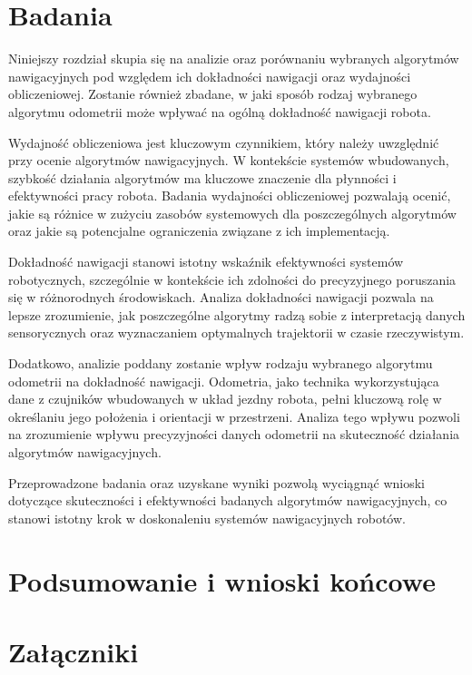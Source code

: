 \documentclass[12pt,twoside]{article}
\begin{document}
\section{Badania}

Niniejszy rozdział skupia się na analizie oraz porównaniu wybranych algorytmów nawigacyjnych pod względem ich dokładności nawigacji oraz wydajności obliczeniowej. Zostanie również zbadane, w jaki sposób rodzaj wybranego algorytmu odometrii może wpływać na ogólną dokładność nawigacji robota.

Wydajność obliczeniowa jest kluczowym czynnikiem, który należy uwzględnić przy ocenie algorytmów nawigacyjnych. W kontekście systemów wbudowanych, szybkość działania algorytmów ma kluczowe znaczenie dla płynności i efektywności pracy robota. Badania wydajności obliczeniowej pozwalają ocenić, jakie są różnice w zużyciu zasobów systemowych dla poszczególnych algorytmów oraz jakie są potencjalne ograniczenia związane z ich implementacją.

Dokładność nawigacji stanowi istotny wskaźnik efektywności systemów robotycznych, szczególnie w kontekście ich zdolności do precyzyjnego poruszania się w różnorodnych środowiskach. Analiza dokładności nawigacji pozwala na lepsze zrozumienie, jak poszczególne algorytmy radzą sobie z interpretacją danych sensorycznych oraz wyznaczaniem optymalnych trajektorii w czasie rzeczywistym.

Dodatkowo, analizie poddany zostanie wpływ rodzaju wybranego algorytmu odometrii na dokładność nawigacji. Odometria, jako technika wykorzystująca dane z czujników wbudowanych w układ jezdny robota, pełni kluczową rolę w określaniu jego położenia i orientacji w przestrzeni. Analiza tego wpływu pozwoli na zrozumienie wpływu precyzyjności danych odometrii na skuteczność działania algorytmów nawigacyjnych.

Przeprowadzone badania oraz uzyskane wyniki pozwolą wyciągnąć wnioski dotyczące skuteczności i efektywności badanych algorytmów nawigacyjnych, co stanowi istotny krok w doskonaleniu systemów nawigacyjnych robotów.

\section{Podsumowanie i wnioski końcowe}



\section*{Załączniki}
\end{document}
